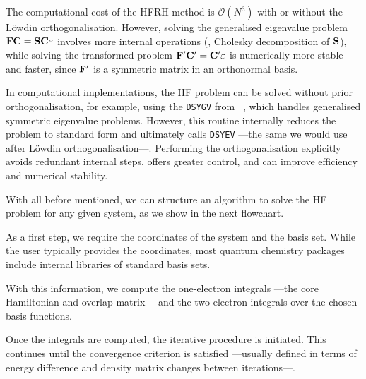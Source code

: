 The computational cost of the \gls{HFRH} method is
$\mathcal{O}(N^3)$ with or without the Löwdin orthogonalisation. However,
solving the generalised eigenvalue problem $\mFock \mC = \mOverlap \mC \eps$
involves more internal operations (\eg, Cholesky decomposition of $\mOverlap$),
while solving the transformed problem $\mFock' \mC' = \mC' \varepsilon$ is
numerically more stable and faster, since $\mFock'$ is a symmetric matrix in an
orthonormal basis.

\newpage
In computational implementations, the \gls{HF} problem can be solved without
prior orthogonalisation, for example, using the \texttt{DSYGV} \subroutine from
\lapack~\cite{laug}, which handles generalised symmetric eigenvalue
problems. However, this routine internally reduces the problem to standard form
and ultimately calls \texttt{DSYEV} ---the same \subroutine we would use after
Löwdin orthogonalisation---. Performing the orthogonalisation explicitly avoids
redundant internal steps, offers greater control, and can improve efficiency
and numerical stability.

With all before mentioned, we can structure an algorithm to solve the
\gls{HF} problem for any given system, as we show in the next flowchart.

\vspace{.3cm}%
\begin{minipage}{0.45\textwidth}
  
\end{minipage}
%
\begin{minipage}[t!]{0.45\textwidth}
  \vspace{0.5cm}%
  \hspace*{\parindent} As a first step, we require the coordinates of the system and the
  basis set. While the user typically provides the coordinates, most quantum
  chemistry packages include internal libraries of standard basis sets.

  \vspace{4.5cm}%

  \hspace*{\parindent} With this information, we compute the one-electron integrals ---the core
  Hamiltonian and overlap matrix--- and the two-electron integrals over the
  chosen basis functions.
\end{minipage}

\vspace{.3cm}%
Once the integrals are computed, the iterative procedure is initiated. This
continues until the convergence criterion is satisfied ---usually
defined in terms of energy difference and density matrix changes between
iterations---.

